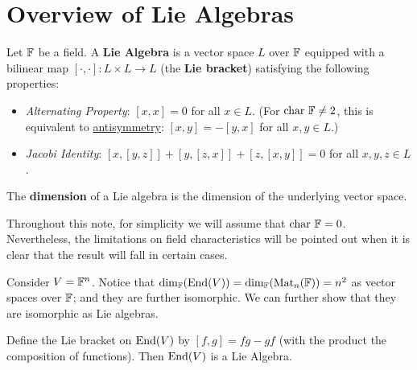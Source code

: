 \documentclass{article}
\begin{document}

\tableofcontents  
\clearpage

\section{Overview of Lie Algebras}

\begin{definition}
    Let $\mathbb{F}$ be a field. A \textbf{Lie Algebra} is a vector space $L$ over $\mathbb{F}$ equipped with a bilinear map $[\cdot, \cdot]: L \times L \to L$ (the \textbf{Lie bracket}) satisfying the following properties:
    \begin{itemize}
        \item \emph{Alternating Property}: $[x, x] = 0$ for all $x \in L$. (For $\mathrm{char}\ {\mathbb{F}} \neq 2$, this is equivalent to \underline{antisymmetry}: $[x, y] = -[y, x]$ for all $x, y \in L$.)
        \item \emph{Jacobi Identity}: $[x, [y, z]] + [y, [z, x]] + [z, [x, y]] = 0$ for all $x, y, z \in L$.
    \end{itemize}
    The \textbf{dimension} of a Lie algebra is the dimension of the underlying vector space.
\end{definition}
\nogap
\begin{remark}
    Throughout this note, for simplicity we will assume that $\mathrm{char}\ {\mathbb{F}} = 0$. Nevertheless, the limitations on field characteristics will be pointed out when it is clear that the result will fall in certain cases.
\end{remark}

\begin{example}
    Consider $V = \mathbb{F}^n$. Notice that $\dim_{\mathbb{F}} (\mathrm{End}(V)) = \dim_{\mathbb{F}} (\operatorname{Mat}_n(\mathbb{F})) = n^2$ as vector spaces over $\mathbb{F}$; and they are further isomorphic. We can further show that they are isomorphic as Lie algebras. 
\end{example}

\begin{proposition}
    Define the Lie bracket on $\mathrm{End}(V)$ by $[f, g] = fg - gf$ (with the product the composition of functions). Then $\mathrm{End}(V)$ is a Lie Algebra.
\end{proposition}
\end{document}
